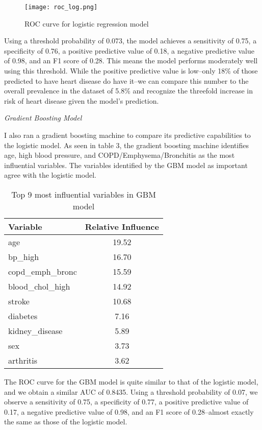 \documentclass[12pt]{article}
\begin{document}
\begin{figure}[h!]
\centering
\texttt{[image: roc\_log.png]}
\caption{ROC curve for logistic regression model}
\end{figure}

Using a threshold probability of 0.073, the model achieves a sensitivity of 0.75, a specificity of 0.76, a positive predictive value of 0.18, a negative predictive value of 0.98, and an F1 score of 0.28. This means the model performs moderately well using this threshold. While the positive predictive value is low--only 18\% of those predicted to have heart disease do have it--we can compare this number to the overall prevalence in the dataset of 5.8\% and recognize the threefold increase in risk of heart disease given the model's prediction.

\medskip \noindent \textit{Gradient Boosting Model}

\medskip I also ran a gradient boosting machine to compare its predictive capabilities to the logistic model. As seen in table 3, the gradient boosting machine identifies age, high blood pressure, and COPD/Emphysema/Bronchitis as the most influential variables. The variables identified by the GBM model as important agree with the logistic model.

\begin{table}[h!]
    \centering
    \begin{tabular}{l|c}
        Variable & Relative Influence \\ \hline
        age & 19.52 \\ 
        bp\_high & 16.70 \\
        copd\_emph\_bronc & 15.59 \\
        blood\_chol\_high & 14.92 \\
        stroke & 10.68 \\
        diabetes & 7.16 \\
        kidney\_disease & 5.89 \\
        sex & 3.73 \\
        arthritis & 3.62 \\
    \end{tabular}
    \caption{Top 9 most influential variables in GBM model}
\label{relativeinfluence}
\end{table}

The ROC curve for the GBM model is quite similar to that of the logistic model, and we obtain a similar AUC of 0.8435. Using a threshold probability of 0.07, we observe a sensitivity of 0.75, a specificity of 0.77, a positive predictive value of 0.17, a negative predictive value of 0.98, and an F1 score of 0.28--almost exactly the same as those of the logistic model.
\end{document}
